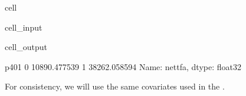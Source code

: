 \documentclass[letterpaper,10pt,english]{jupyterBook}
\begin{document}
\begin{sphinxuseclass}{cell}\begin{sphinxVerbatimInput}

\begin{sphinxuseclass}{cell_input}
\begin{sphinxVerbatim}[commandchars=\\\{\}]
\PYG{p}{[}\PYG{p}{]}
\end{sphinxVerbatim}

\end{sphinxuseclass}\end{sphinxVerbatimInput}
\begin{sphinxVerbatimOutput}

\begin{sphinxuseclass}{cell_output}
\begin{sphinxVerbatim}[commandchars=\\\{\}]
p401
0    10890.477539
1    38262.058594
Name: net\PYGZus{}tfa, dtype: float32
\end{sphinxVerbatim}

\end{sphinxuseclass}\end{sphinxVerbatimOutput}

\end{sphinxuseclass}
\sphinxAtStartPar
For consistency, we will use the same covariates used in the .
\end{document}

